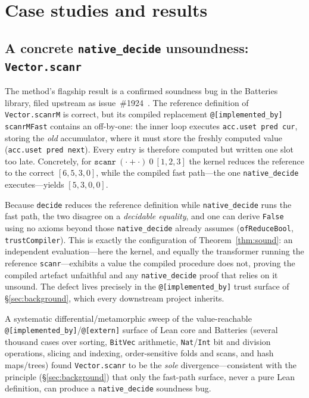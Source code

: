 \documentclass[11pt]{article}
\theoremstyle{definition}
\theoremstyle{plain}
\theoremstyle{remark}
\begin{document}
\section{Case studies and results}\label{sec:results}

\subsection{A concrete \texttt{native\_decide} unsoundness: \texttt{Vector.scanr}}\label{sec:scanr}

The method's flagship result is a confirmed soundness bug in the Batteries library, filed upstream as
issue~\#1924~\cite{batteries1924}. The reference definition of \texttt{Vector.scanrM} is correct, but
its compiled replacement \texttt{@[implemented\_by] scanrMFast} contains an off-by-one: the inner loop
executes \texttt{acc.uset pred cur}, storing the \emph{old} accumulator, where it must store the freshly
computed value (\texttt{acc.uset pred next}). Every entry is therefore computed but written one slot too
late. Concretely, for $\texttt{scanr}\ (\cdot{+}\cdot)\ 0\ [1,2,3]$ the kernel reduces the reference to
the correct $[6,5,3,0]$, while the compiled fast path---the one \texttt{native\_decide} executes---yields
$[5,3,0,0]$.

Because \texttt{decide} reduces the reference definition while \texttt{native\_decide} runs the fast
path, the two disagree on a \emph{decidable equality}, and one can derive \texttt{False} using no axioms
beyond those \texttt{native\_decide} already assumes (\texttt{ofReduceBool}, \texttt{trustCompiler}). This
is exactly the configuration of Theorem~\ref{thm:sound}: an independent evaluation---here the kernel, and
equally the transformer running the reference \texttt{scanr}---exhibits a value the compiled procedure
does not, proving the compiled artefact unfaithful and any \texttt{native\_decide} proof that relies on it
unsound. The defect lives precisely in the \texttt{@[implemented\_by]} trust surface of
\S\ref{sec:background}, which every downstream project inherits.

A systematic differential/metamorphic sweep of the value-reachable
\texttt{@[implemented\_by]}/\texttt{@[extern]} surface of Lean core and Batteries (several thousand cases
over sorting, \texttt{BitVec} arithmetic, \texttt{Nat}/\texttt{Int} bit and division operations, slicing
and indexing, order-sensitive folds and scans, and hash maps/trees) found \texttt{Vector.scanr} to be the
\emph{sole} divergence---consistent with the principle (\S\ref{sec:background}) that only the fast-path
surface, never a pure Lean definition, can produce a \texttt{native\_decide} soundness bug.
\end{document}
